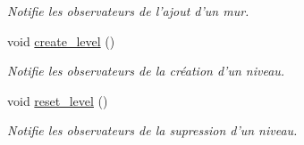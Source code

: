 \begin{DoxyCompactItemize}
\begin{DoxyCompactList}\small\item\em Notifie les observateurs de l'ajout d'un mur. \end{DoxyCompactList}\item 
\hypertarget{classElements_ad4bfaa4ea43fffd8653224165b5bbc29}{void \hyperlink{classElements_ad4bfaa4ea43fffd8653224165b5bbc29}{create\+\_\+level} ()}\label{classElements_ad4bfaa4ea43fffd8653224165b5bbc29}

\begin{DoxyCompactList}\small\item\em Notifie les observateurs de la création d'un niveau. \end{DoxyCompactList}\item 
\hypertarget{classElements_a938cdaf6c97d1c9e5db80280b6379176}{void \hyperlink{classElements_a938cdaf6c97d1c9e5db80280b6379176}{reset\+\_\+level} ()}\label{classElements_a938cdaf6c97d1c9e5db80280b6379176}

\begin{DoxyCompactList}\small\item\em Notifie les observateurs de la supression d'un niveau. \end{DoxyCompactList}\end{DoxyCompactItemize}
